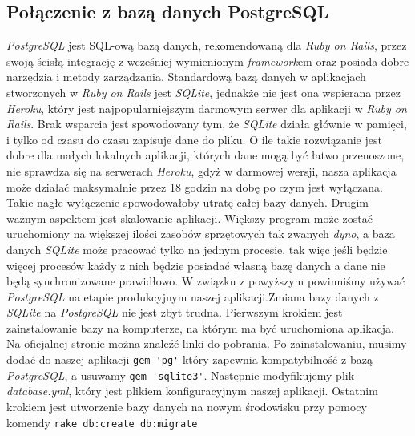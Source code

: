\documentclass[openright]{xmgr}
\begin{document}
\subsection{Połączenie z bazą danych PostgreSQL}
\textit{PostgreSQL} jest SQL-ową bazą danych, rekomendowaną dla \textit{Ruby on Rails}, przez swoją ścisłą integrację z wcześniej wymienionym \textit{framework}em oraz posiada dobre narzędzia i metody zarządzania. Standardową bazą danych w aplikacjach stworzonych w \textit{Ruby on Rails} jest \textit{SQLite}, jednakże nie jest ona wspierana przez \textit{Heroku}, który jest najpopularniejszym darmowym serwer dla aplikacji w \textit{Ruby on Rails}. Brak wsparcia jest spowodowany tym, że \textit{SQLite} działa głównie w pamięci, i tylko od czasu do czasu zapisuje dane do pliku. O ile takie rozwiązanie jest dobre dla małych lokalnych aplikacji, których dane mogą być łatwo przenoszone, nie sprawdza się na serwerach \textit{Heroku}, gdyż w darmowej wersji, nasza aplikacja może działać maksymalnie przez 18 godzin na dobę po czym jest wyłączana. Takie nagłe wyłączenie spowodowałoby utratę całej bazy danych. Drugim ważnym aspektem jest skalowanie aplikacji. Większy program może zostać uruchomiony na większej ilości zasobów sprzętowych tak zwanych \textit{dyno}, a baza danych \textit{SQLite} może pracować tylko na jednym procesie, tak więc jeśli będzie więcej procesów każdy z nich będzie posiadać własną bazę danych a dane nie będą synchronizowane prawidłowo. W związku z powyższym powinniśmy używać \textit{PostgreSQL} na etapie produkcyjnym naszej aplikacji.\newline \indent Zmiana bazy danych z \textit{SQLite} na \textit{PostgreSQL} nie jest zbyt trudna. Pierwszym krokiem jest zainstalowanie bazy na komputerze, na którym ma być uruchomiona aplikacja. Na oficjalnej stronie można znaleźć linki do pobrania. Po zainstalowaniu, musimy dodać do naszej aplikacji \verb|gem 'pg'| który zapewnia kompatybilność z bazą \textit{PostgreSQL}, a usuwamy \verb|gem 'sqlite3'|. Następnie modyfikujemy plik \textit{database.yml}, który jest plikiem konfiguracyjnym naszej aplikacji. Ostatnim krokiem jest utworzenie bazy danych na nowym środowisku przy pomocy komendy \verb|rake db:create db:migrate|  
\end{document}
